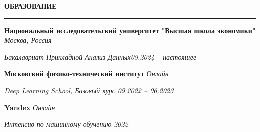 \documentclass[10pt,a4paper]{article}
\newcommand{\sechead}[1]{%
  \noindent\textbf{#1}\par
  \vspace{-8pt}
  \noindent\rule{\linewidth}{0.4pt}\par\vspace{0.1cm}
}
\begin{document}
\sechead{ОБРАЗОВАНИЕ}

\textbf{Национальный исследовательский университет "Высшая школа экономики"} \hfill \emph{Москва, Россия}

	\textit{Бакалавриат Прикладной Анализ Данных}\hfill \emph{09.2024 – настоящее}\vspace{0.2cm}
	
	\textbf{Московский физико-технический институт} \hfill \emph{Онлайн}
	
\textit{Deep Learning School, Базовый курс} \hfill \emph{09.2022 – 06.2023}\vspace{0.2cm}

\textbf{Yandex} \hfill \emph{Онлайн}

\textit{Интенсив по машинному обучению} \hfill \emph{2022}
\end{document}
